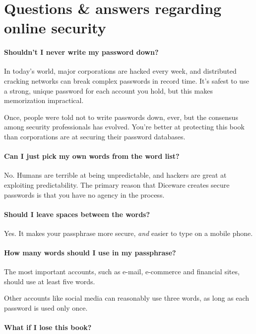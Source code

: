 \chapter*{Questions \& answers regarding online security}
\small

\subsubsection{Shouldn't I never write my password down?}

In today's world, major corporations are hacked every week, and distributed cracking networks can break complex passwords in record time. It's safest to use a strong, unique password for each account you hold, but this makes memorization impractical. 

Once, people were told not to write passwords down, ever, but the consensus among security professionals has evolved. You're better at protecting this book than corporations are at securing their password databases. 

\subsubsection{Can I just pick my own words from the word list?}

No. Humans are terrible at being unpredictable, and hackers are great at exploiting predictability. The primary reason that Diceware creates secure passwords is that you have no agency in the process.

\subsubsection{Should I leave spaces between the words?}

Yes. It makes your passphrase more secure, \textit{and} easier to type on a mobile phone.

\subsubsection{How many words should I use in my passphrase?}

The most important accounts, such as e-mail, e-commerce and financial sites, should use at least five words.

Other accounts like social media can reasonably use three words, as long as each password is used only once.

\subsubsection{What if I lose this book?}

